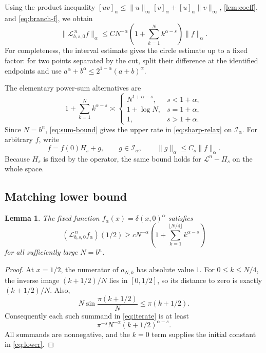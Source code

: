 \documentclass[11pt,a4paper]{article}
\numberwithin{equation}{section}
\newtheorem{lemma}[lemma]{Lemma}
\theoremstyle{definition}
\theoremstyle{remark}
\newcommand{\Lop}{\mathcal L}
\newcommand{\Proj}{\Pi}
\begin{document}
Using the product inequality
$[uv]_\alpha\le\|u\|_\infty[v]_\alpha+[u]_\alpha\|v\|_\infty$,
\cref{lem:coeff}, and \cref{eq:branch-f}, we obtain
\begin{equation}
 \|\Lop_{b,s,0}^{\,n}f\|_\alpha
 \le C N^{-\alpha}
 \left(1+\sum_{k=1}^{N}k^{\alpha-s}\right)\|f\|_\alpha.
 \label{eq:sum-bound}
\end{equation}
For completeness, the interval estimate gives the circle estimate up to a
fixed factor: for two points separated by the cut, split their difference
at the identified endpoints and use
$a^\alpha+b^\alpha\le2^{1-\alpha}(a+b)^\alpha$.

The elementary power-sum alternatives are
\begin{equation}
 1+\sum_{k=1}^{N}k^{\alpha-s}\asymp
 \begin{cases}
 N^{1+\alpha-s},&s<1+\alpha,\\
 1+\log N,&s=1+\alpha,\\
 1,&s>1+\alpha.
 \end{cases}
 \label{eq:powersum}
\end{equation}
Since $N=b^n$, \cref{eq:sum-bound} gives the upper rate in
\cref{eq:sharp-relax} on $\mathcal I_\alpha$.
For arbitrary $f$, write
\[
 f=f(0)H_s+g,\qquad g\in\mathcal I_\alpha,
 \qquad \|g\|_\alpha\le C_s\|f\|_\alpha.
\]
Because $H_s$ is fixed by the operator, the same bound holds for
$\Lop^n-\Proj_s$ on the whole space.

\subsection{Matching lower bound}
\begin{lemma}
\label{lem:lower}
The fixed function $f_\alpha(x)=\delta(x,0)^\alpha$ satisfies
\begin{equation}
 \left(\Lop_{b,s,0}^{\,n}f_\alpha\right)(1/2)
 \ge c N^{-\alpha}
 \left(1+\sum_{k=1}^{\lfloor N/4\rfloor}k^{\alpha-s}\right)
 \label{eq:lower}
\end{equation}
for all sufficiently large $N=b^n$.
\end{lemma}
\begin{proof}
At $x=1/2$, the numerator of $a_{N,k}$ has absolute value $1$.
For $0\le k\le N/4$, the inverse image $(k+1/2)/N$ lies in $[0,1/2]$,
so its distance to zero is exactly $(k+1/2)/N$. Also,
\[
 N\sin\frac{\pi(k+1/2)}N\le\pi(k+1/2).
\]
Consequently each such summand in \cref{eq:iterate} is at least
\[
 \pi^{-s}N^{-\alpha}(k+1/2)^{\alpha-s}.
\]
All summands are nonnegative, and the $k=0$ term supplies the initial
constant in \cref{eq:lower}.
\end{proof}
\end{document}
